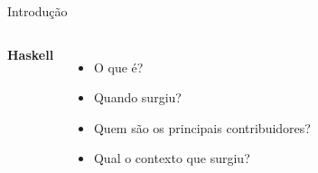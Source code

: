 \begin{frame}{Introdução}
 
    \begin{columns}
      \textbf{Haskell} 

      \begin{itemize}
        \item O que é?
        \item Quando surgiu?
        \item Quem são os principais contribuidores?
        \item Qual o contexto que surgiu?
         
      \end{itemize}


    \end{columns}

\end{frame}